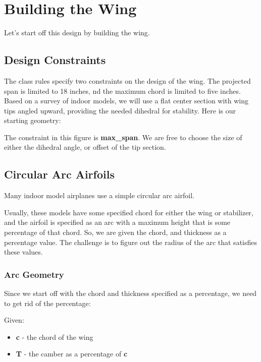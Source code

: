 \section*{Building the Wing}

Let's start off this design by building the wing.

\subsection*{Design Constraints}

The class rules specify two constraints on the design of the wing. The
projected span is limited to 18 inches, nd the maximum chord is limited to five
inches. Based on a survey of indoor models, we will use a flat center section
with wing tips angled upward, providing the needed dihedral for stability. Here
is our starting geometry:



The constraint in this figure is {\bf max\_span}. We are free to choose the
size of either the dihedral angle, or offset of the tip section.

\subsection*{Circular Arc Airfoils}

Many indoor model airplanes use a simple circular arc airfoil.

Usually, these models have some specified chord for either the wing or
stabilizer, and the airfoil is specified as an arc with a maximum height that
is some percentage of that chord. So, we are given the chord, and thickness as
a percentage value. The challenge is to figure out the radius of the arc that
satisfies these values.

\subsubsection*{Arc Geometry}

Since we start off with the chord and thickness specified as a percentage, we
need to get rid of the percentage:

Given:

\begin{itemize}
  \item{{\bf c} - the chord of the wing}
  \item{{\bf T} - the camber as a percentage of {\bf c}}
\end{itemize}

